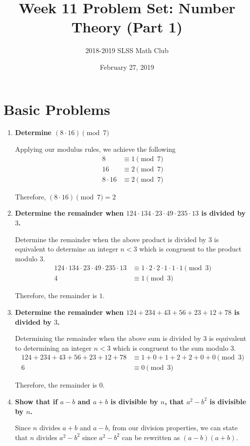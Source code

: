 \documentclass[12pt]{article}
\title{Week 11 Problem Set: Number Theory (Part 1)\vspace{-3mm}}
\author{2018-2019 SLSS Math Club\vspace{-5mm}}
\date{February 27, 2019\vspace{-5mm}}
\begin{document}
\maketitle

\section*{Basic Problems}
\begin{enumerate}
    \item \textbf{Determine $(8 \cdot 16) \pmod{7}$}
    
    Applying our modulus rules, we achieve the following
    \begin{align*}
        8 &\equiv 1 \pmod{7} \\
        16 &\equiv 2 \pmod{7} \\
        8 \cdot 16 &\equiv 2 \pmod{7}
    \end{align*}
    
    Therefore, $(8 \cdot 16) \pmod{7} = 2$
    
    \item \textbf{Determine the remainder when $124 \cdot 134 \cdot 23 \cdot 49 \cdot 235 \cdot 13$ is divided by $3$.}
    
    Determine the remainder when the above product is divided by $3$ is equivalent to determine an integer $n < 3$ which is congruent to the product modulo $3$.
    \begin{align*}
        124 \cdot 134 \cdot 23 \cdot 49 \cdot 235 \cdot 13 &\equiv 1 \cdot 2 \cdot 2 \cdot 1 \cdot 1 \cdot 1 \pmod{3} \\
        4 &\equiv 1 \pmod{3}
    \end{align*}
    
    Therefore, the remainder is $1$.
    
    \item \textbf{Determine the remainder when $124 + 234 + 43 + 56 + 23 + 12 + 78$ is divided by $3$.}
    
    Determining the remainder when the above sum is divided by $3$ is equivalent to determining an integer $n < 3$ which is congruent to the sum modulo $3$.
    \begin{align*}
        124 + 234 + 43 + 56 + 23 + 12 + 78 &\equiv 1 + 0 + 1 + 2 + 2 + 0 + 0 \pmod{3} \\
        6 &\equiv 0 \pmod 3
    \end{align*}
    
    Therefore, the remainder is $0$.
    
    \item \textbf{Show that if $a - b$ and $a + b$ is divisible by $n$, that $a^2 - b^2$ is divisible by $n$.}
    
    Since $n$ divides $a + b$ and $a - b$, from our division properties, we can state that $n$ divides $a^2 - b^2$ since $a^2 - b^2$ can be rewritten as $(a - b)(a + b)$.
    
\end{enumerate}
\end{document}
